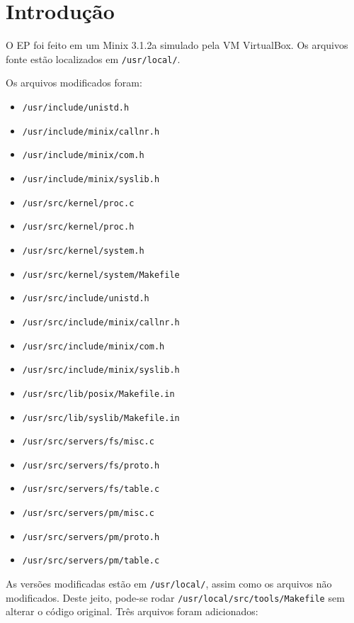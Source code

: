 \documentclass{amsart}
\title[]{\rule{10.5cm}{0.8pt}\\Exercício-Programa 2:\\
Escalonamento de Processos
\\\vspace{2mm}\footnotesize
  Sistemas Operacionais --- MAC0422\\\rule{10cm}{0.8pt}}
\author[]{Renato Lui Geh\\NUSP\@: 8536030\\
          Guilherme Freire\\NUSP\@: 7557373}
\theoremstyle{plain}
\newcommand{\code}[1]{\lstinline[mathescape=true]{#1}}
\begin{document}
\date{\today}
\maketitle

\section{Introdução}

O EP foi feito em um Minix 3.1.2a simulado pela VM VirtualBox. Os arquivos fonte estão localizados
em \code{/usr/local/}.

Os arquivos modificados foram:

\begin{itemize}
  \item \code{/usr/include/unistd.h}
  \item \code{/usr/include/minix/callnr.h}
  \item \code{/usr/include/minix/com.h}
  \item \code{/usr/include/minix/syslib.h}
  \item \code{/usr/src/kernel/proc.c}
  \item \code{/usr/src/kernel/proc.h}
  \item \code{/usr/src/kernel/system.h}
  \item \code{/usr/src/kernel/system/Makefile}
  \item \code{/usr/src/include/unistd.h}
  \item \code{/usr/src/include/minix/callnr.h}
  \item \code{/usr/src/include/minix/com.h}
  \item \code{/usr/src/include/minix/syslib.h}
  \item \code{/usr/src/lib/posix/Makefile.in}
  \item \code{/usr/src/lib/syslib/Makefile.in}
  \item \code{/usr/src/servers/fs/misc.c}
  \item \code{/usr/src/servers/fs/proto.h}
  \item \code{/usr/src/servers/fs/table.c}
  \item \code{/usr/src/servers/pm/misc.c}
  \item \code{/usr/src/servers/pm/proto.h}
  \item \code{/usr/src/servers/pm/table.c}
\end{itemize}

As versões modificadas estão em \code{/usr/local/}, assim como os arquivos não modificados. Deste
jeito, pode-se rodar \code{/usr/local/src/tools/Makefile} sem alterar o código original. Três
arquivos foram adicionados:
\end{document}
